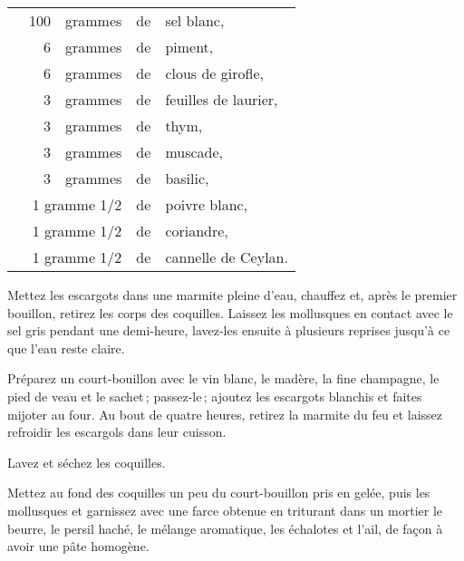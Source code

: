 \footnotesize
\begin{longtable}{rrrrp{16em}}   
  & 100 & grammes    & de & sel blanc,                                                                    \\
  &   6 & grammes    & de & piment,                                                                       \\
  &   6 & grammes    & de & clous de girofle,                                                             \\
  &   3 & grammes    & de & feuilles de laurier,                                                          \\
  &   3 & grammes    & de & thym,                                                                         \\
  &   3 & grammes    & de & muscade,                                                                      \\
  &   3 & grammes    & de & basilic,                                                                      \\
  & \multicolumn{2}{r}{1 gramme 1/2} & de & poivre blanc,                                                 \\
  & \multicolumn{2}{r}{1 gramme 1/2} & de & coriandre,                                                    \\
  & \multicolumn{2}{r}{1 gramme 1/2} & de & cannelle de Ceylan.                                           \\
\end{longtable}
\normalsize

Mettez les escargots dans une marmite pleine d'eau, chauffez et, après le premier
bouillon, retirez les corps des coquilles. Laissez les mollusques en contact avec le
sel gris pendant une demi-heure, lavez-les ensuite à plusieurs reprises jusqu'à ce
que l’eau reste claire.

Préparez un court-bouillon avec le vin blanc, le madère, la fine champagne, le
pied de veau et le sachet ; passez-le ; ajoutez les escargots blanchis et
faites mijoter au four. Au bout de quatre heures, retirez la marmite du feu et
laissez refroidir les escargols dans leur cuisson.

Lavez et séchez les coquilles.

Mettez au fond des coquilles un peu du court-bouillon pris en gelée, puis les
mollusques et garnissez avec une farce obtenue en triturant dans un mortier le
beurre, le persil haché, le mélange aromatique, les échalotes et l'ail, de
façon à avoir une pâte homogène.

